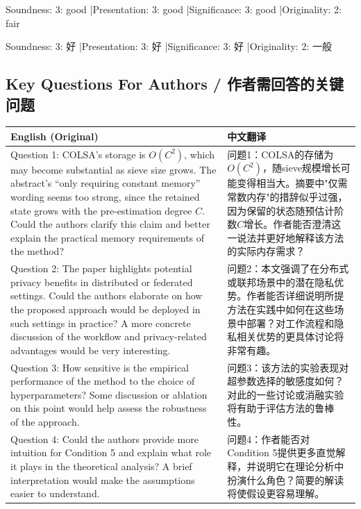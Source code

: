 \documentclass[10pt,a4paper]{article}
\begin{document}
\noindent Soundness: 3: good \quad|\quad Presentation: 3: good \quad|\quad Significance: 3: good \quad|\quad Originality: 2: fair

\noindent Soundness: 3: 好 \quad|\quad Presentation: 3: 好 \quad|\quad Significance: 3: 好 \quad|\quad Originality: 2: 一般

\subsection{Key Questions For Authors / 作者需回答的关键问题}

\begin{longtable}{L{0.48\textwidth}|L{0.48\textwidth}}
\hline
\textbf{English (Original)} & \textbf{中文翻译} \\
\hline
Question 1: COLSA's storage is $O(C^2)$, which may become substantial as sieve size grows. The abstract's ``only requiring constant memory'' wording seems too strong, since the retained state grows with the pre-estimation degree $C$. Could the authors clarify this claim and better explain the practical memory requirements of the method?
&
问题1：COLSA的存储为$O(C^2)$，随sieve规模增长可能变得相当大。摘要中"仅需常数内存"的措辞似乎过强，因为保留的状态随预估计阶数$C$增长。作者能否澄清这一说法并更好地解释该方法的实际内存需求？ \\
\hline
Question 2: The paper highlights potential privacy benefits in distributed or federated settings. Could the authors elaborate on how the proposed approach would be deployed in such settings in practice? A more concrete discussion of the workflow and privacy-related advantages would be very interesting.
&
问题2：本文强调了在分布式或联邦场景中的潜在隐私优势。作者能否详细说明所提方法在实践中如何在这些场景中部署？对工作流程和隐私相关优势的更具体讨论将非常有趣。 \\
\hline
Question 3: How sensitive is the empirical performance of the method to the choice of hyperparameters? Some discussion or ablation on this point would help assess the robustness of the approach.
&
问题3：该方法的实验表现对超参数选择的敏感度如何？对此的一些讨论或消融实验将有助于评估方法的鲁棒性。 \\
\hline
Question 4: Could the authors provide more intuition for Condition 5 and explain what role it plays in the theoretical analysis? A brief interpretation would make the assumptions easier to understand.
&
问题4：作者能否对Condition 5提供更多直觉解释，并说明它在理论分析中扮演什么角色？简要的解读将使假设更容易理解。 \\
\hline
\end{longtable}
\end{document}

